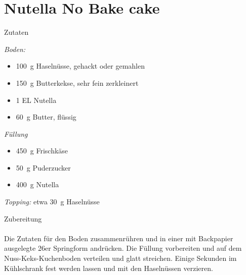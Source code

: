 \section*{Nutella No Bake cake}
\ihead{}\ohead{}
\cfoot{}
{\Large Zutaten}
\begin{multicols}{2}
\textit{Boden:}
\begin{itemize}
    \item \SI{100}{g} Haselnüsse, gehackt oder gemahlen
    \item \SI{150}{g} Butterkekse, sehr fein zerkleinert
    \item \num{1} EL Nutella
    \item \SI{60}{g} Butter, flüssig
\end{itemize}
\textit{Füllung}
\begin{itemize}
    \item \SI{450}{g} Frischkäse
    \item \SI{50}{g} Puderzucker
    \item \SI{400}{g} Nutella
\end{itemize}
\textit{Topping:} etwa \SI{30}{g} Haselnüsse
\end{multicols}
\noindent
{\Large Zubereitung}\\
\\
Die Zutaten für den Boden zusammenrühren und in einer mit Backpapier ausgelegte \num{26}er Springform andrücken.
Die Füllung vorbereiten und auf dem Nuss-Keks-Kuchenboden verteilen und glatt streichen.
Einige Sekunden im Kühlschrank fest werden lassen und mit den Haselnüssen verzieren.
